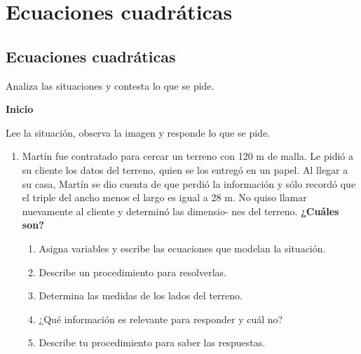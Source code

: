 \thispagestyle{plain}
\section{Ecuaciones cuadráticas}
\subsection{Ecuaciones cuadráticas}

Analiza las situaciones y contesta lo que se pide.\\

\begin{boxK}
    \begin{center}\textbf{Inicio}\end{center}
    Lee la situación, observa la imagen y responde lo que se pide.
    \begin{enumerate}
        \item Martín fue contratado para cercar un terreno con 120 m de malla. Le pidió a su cliente
              los datos del terreno, quien se los entregó en un papel. Al llegar a su casa, Martín se dio
              cuenta de que perdió la información y sólo recordó que el triple del ancho menos el
              largo es igual a 28 m. No quiso llamar nuevamente al cliente y determinó las dimensio-
              nes del terreno. \textbf{¿Cuáles son?}
              \begin{enumerate}
                  \item Asigna variables y escribe las ecuaciones que modelan la situación.
                  \item Describe un procedimiento para resolverlas.
                  \item Determina las medidas de los lados del terreno.
                  \item ¿Qué información es relevante para responder y
                        cuál no?
                  \item Describe tu procedimiento para saber las respuestas.
              \end{enumerate}
    \end{enumerate}

\end{boxK}

